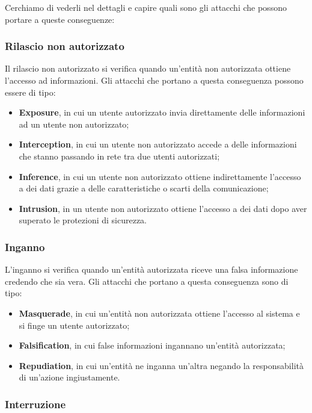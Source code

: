 \documentclass[14pt]{extarticle}
\begin{document}
Cerchiamo di vederli nel dettagli e capire quali sono gli attacchi che possono
portare a queste conseguenze:

\subsubsection{Rilascio non autorizzato}

Il rilascio non autorizzato si verifica quando un'entità non autorizzata ottiene
l'accesso ad informazioni. Gli attacchi che portano a questa conseguenza possono
essere di tipo:
\begin{itemize}
    \item \textbf{Exposure}, in cui un utente autorizzato invia direttamente
    delle informazioni ad un utente non autorizzato;
    \item \textbf{Interception}, in cui un utente non autorizzato accede a delle
    informazioni che stanno passando in rete tra due utenti autorizzati;
    \item \textbf{Inference}, in cui un utente non autorizzato ottiene
    indirettamente l'accesso a dei dati grazie a delle caratteristiche o scarti
    della comunicazione;
    \item \textbf{Intrusion}, in un utente non autorizzato ottiene l'accesso a
    dei dati dopo aver superato le protezioni di sicurezza.   
\end{itemize}

\subsubsection{Inganno}

L'inganno si verifica quando un'entità autorizzata riceve una falsa informazione
credendo che sia vera. Gli attacchi che portano a questa conseguenza sono di
tipo:
\begin{itemize}
    \item \textbf{Masquerade}, in cui un'entità non autorizzata ottiene
    l'accesso al sistema e si finge un utente autorizzato;
    \item \textbf{Falsification}, in cui false informazioni ingannano un'entità
    autorizzata;
    \item \textbf{Repudiation}, in cui un'entità ne inganna un'altra negando la
    responsabilità di un'azione ingiustamente.  
\end{itemize}

\subsubsection{Interruzione}
\end{document}
